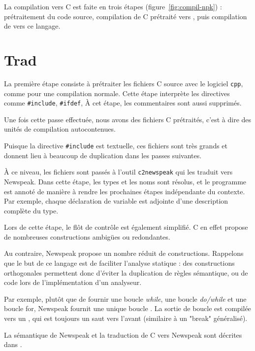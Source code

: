 
La compilation vers C est faite en trois étapes (figure~\ref{fig:compil-npk}) :
prétraitement du code source, compilation de C prétraité vers \newspeak{}, puis
compilation de \newspeak{} vers ce langage.

\section*{Trad}

La première étape consiste à prétraiter les fichiers C source avec le logiciel
\texttt{cpp}, comme pour une compilation normale. Cette étape interprète les
directives comme \texttt{\#include}, \texttt{\#ifdef}, À cet étape, les
commentaires sont aussi supprimés.


Une fois cette passe effectuée, nous avons des fichiers C prétraités,
c'est à dire des unités de compilation autocontenues. %

Puisque la directive \texttt{\#include} est textuelle, ces fichiers sont très
grands et donnent lieu à beaucoup de duplication dans les passes suivantes.

À ce niveau, les fichiers sont passés à l'outil \texttt{c2newspeak} qui les
traduit vers Newspeak. Dans cette étape, les types et les noms sont résolus, et
le programme est annoté de manière à rendre les prochaines étapes indépendante
du contexte. Par exemple, chaque déclaration de variable est adjointe d'une
description complète du type.

Lors de cette étape, le flôt de contrôle est également simplifié. C en effet
propose de nombreuses constructions ambigües ou redondantes.

Au contraire, Newspeak propose un nombre réduit de constructions. Rappelons que
le but de ce langage est de faciliter l'analyse statique : des constructions
orthogonales permettent donc d'éviter la duplication de règles sémantique, ou de
code lors de l'implémentation d'un analyseur.

Par exemple, plutôt que de fournir une boucle \emph{while}, une boucle
\emph{do/while} et une boucle for, Newspeak fournit une unique boucle
\npkWhile{}. La sortie de boucle est compilée vers un \npkGoto{}\cite{goto}, qui est
toujours un saut vers l'avant (similaire à un "break" généralisé).

La sémantique de Newspeak et la traduction de C vers Newspeak sont décrites dans
\cite{newspeak}.

